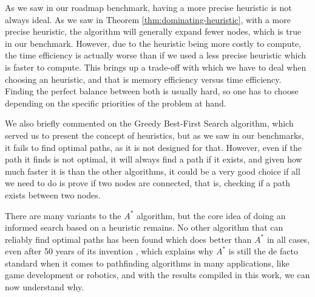 \documentclass[a4paper,10pt]{report}
\begin{document}
As we saw in our roadmap benchmark, having a more precise heuristic is not always ideal. As we saw in Theorem \ref{thm:dominating-heuristic}, with a more precise heuristic, the algorithm will generally expand fewer nodes, which is true in our benchmark. However, due to the heuristic being more costly to compute, the time efficiency is actually worse than if we used a less precise heuristic which is faster to compute. This brings up a trade-off with which we have to deal when choosing an heuristic, and that is memory efficiency versus time efficiency. Finding the perfect balance between both is usually hard, so one has to choose depending on the specific priorities of the problem at hand.

We also briefly commented on the Greedy Best-First Search algorithm, which served us to present the concept of heuristics, but as we saw in our benchmarks, it fails to find optimal paths, as it is not designed for that. However, even if the path it finds is not optimal, it will always find a path if it exists, and given how much faster it is than the other algorithms, it could be a very good choice if all we need to do is prove if two nodes are connected, that is, checking if a path exists between two nodes.

There are many variants to the $A^*$ algorithm, but the core idea of doing an informed search based on a heuristic remains. No other algorithm that can reliably find optimal paths has been found which does better than $A^*$ in all cases, even after 50 years of its invention \cite{hart}, which explains why $A^*$ is still the de facto standard when it comes to pathfinding algorithms in many applications, like game development or robotics, and with the results compiled in this work, we can now understand why.
\end{document}
